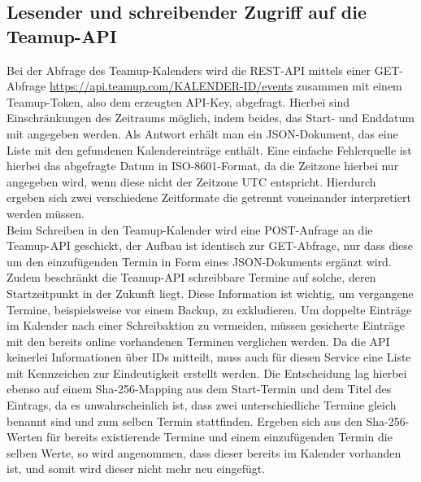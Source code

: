 \subsection{Lesender und schreibender Zugriff auf die Teamup-API}
Bei der Abfrage des Teamup-Kalenders wird die REST-API mittels einer GET-Abfrage \url{https://api.teamup.com/KALENDER-ID/events} zusammen mit einem Teamup-Token, also dem erzeugten API-Key, abgefragt. Hierbei sind Einschränkungen des Zeitraums möglich, indem beides, das Start- und Enddatum mit angegeben werden. Als Antwort erhält man ein JSON-Dokument, das eine Liste mit den gefundenen Kalendereinträge enthält. Eine einfache Fehlerquelle ist hierbei das abgefragte Datum in ISO-8601-Format, da die Zeitzone hierbei nur angegeben wird, wenn diese nicht der Zeitzone UTC entspricht. Hierdurch ergeben sich zwei verschiedene Zeitformate die getrennt voneinander interpretiert werden müssen. \\
Beim Schreiben in den Teamup-Kalender wird eine POST-Anfrage an die Teamup-API geschickt, der Aufbau ist identisch zur GET-Abfrage, nur dass diese um den einzufügenden Termin in Form eines JSON-Dokuments ergänzt wird. Zudem beschränkt die Teamup-API schreibbare Termine auf solche, deren Startzeitpunkt in der Zukunft liegt. Diese Information ist wichtig, um vergangene Termine, beispielsweise vor einem Backup, zu exkludieren. Um doppelte Einträge im Kalender nach einer Schreibaktion zu vermeiden, müssen gesicherte Einträge mit den bereits online vorhandenen Terminen verglichen werden. Da die API keinerlei Informationen über IDs mitteilt, muss auch für diesen Service eine Liste mit Kennzeichen zur Eindeutigkeit erstellt werden. Die Entscheidung lag hierbei ebenso auf einem Sha-256-Mapping aus dem Start-Termin und dem Titel des Eintrags, da es unwahrscheinlich ist, dass zwei unterschiedliche Termine gleich benannt sind und zum selben Termin stattfinden. Ergeben sich aus den Sha-256-Werten für bereits existierende Termine und einem einzufügenden Termin die selben Werte, so wird angenommen, dass dieser bereits im Kalender vorhanden ist, und somit wird dieser nicht mehr neu eingefügt.